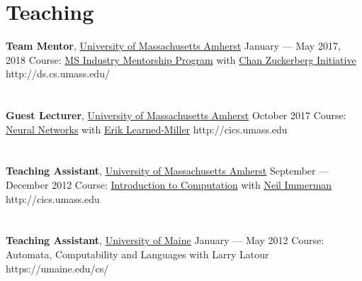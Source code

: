 \documentclass{resume}
\begin{document}
\nocite{*}





\section{Teaching}
\employer
   {\textbf{Team Mentor}, \href{http://cics.umass.edu}{University of Massachusetts Amherst}}
   {January --- May 2017, 2018}
   {Course: \href{http://ds.cs.umass.edu/industry-mentorship-program}{MS Industry Mentorship Program} with \href{https://www.chanzuckerberg.com/science/projects-meta}{Chan Zuckerberg Initiative}} {http://ds.cs.umass.edu/}
\\ \\ \\
\employer
    {\textbf{Guest Lecturer}, \href{http://cics.umass.edu}{University of Massachusetts Amherst}}
    {October 2017}
    {Course: \href{https://compsci682.github.io/syllabus.html}{Neural Networks} with \href{http://cs.umass.edu/~elm}{Erik Learned-Miller}} {http://cics.umass.edu}
\\ \\ \\ 
\employer
    {\textbf{Teaching Assistant}, \href{http://cics.umass.edu}{University of Massachusetts Amherst}}
    {September --- December 2012}
    {Course: \href{https://people.cs.umass.edu/~immerman/cs250/syllabus.html}{Introduction to Computation} with \href{http://cs.umass.edu/~immerman}{Neil Immerman}} {http://cics.umass.edu}
\\ \\ \\ 
\employer
    {\textbf{Teaching Assistant}, \href{https://umaine.edu/cs/}{University of Maine}}
    {January --- May 2012}
    {Course: Automata, Computability and Languages with Larry Latour} {https://umaine.edu/cs/}
\end{document}
